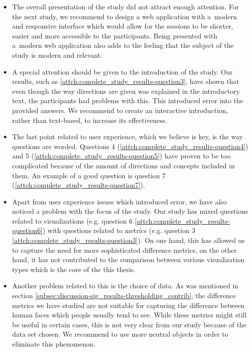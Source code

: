 \begin{itemize}
	\item The overall presentation of the study did not attract enough attention. For the next study, we recommend to design a web application with a~modern and responsive interface which would allow for the sessions to be shorter, easier and more accessible to the participants. Being presented with a~modern web application also adds to the feeling that the subject of the study is modern and relevant.
	\item A special attention should be given to the introduction of the study. Our results, such as \ref{attch:complete_study_results-question3}, have shown that even though the way directions are given was explained in the introductory text, the participants had problems with this. This introduced error into the provided answers. We recommend to create an interactive introduction, rather than text-based, to increase its effectiveness.
	\item The last point related to user experience, which we believe is key, is the way questions are worded. Questions 4 (\ref{attch:complete_study_results-question4}) and 5 (\ref{attch:complete_study_results-question5}) have proven to be too complicated because of the amount of directions and concepts included in them. An example of a good question is question 7 (\ref{attch:complete_study_results-question7}).
	\item Apart from user experience issues which introduced error, we have also noticed a problem with the focus of the study. Our study has mixed questions related to visualizations (e.g. question 6 \ref{attch:complete_study_results-question6}) with questions related to metrics (e.g. question 3 \ref{attch:complete_study_results-question3}). On one hand, this has allowed us to capture the need for more sophisticated difference metrics, on the other hand, it has not contributed to the comparison between various visualization types which is the core of the this thesis.
	\item Another problem related to this is the choice of data. As was mentioned in section \ref{subsec:discussion-sig_results-thresholding_contrib}, the difference metrics we have studied are not suitable for capturing the difference between human faces which people usually tend to see. While these metrics might still be useful in certain cases, this is not very clear from our study because of the data set chosen. We recommend to use more neutral objects in order to eliminate this phenomenon.
\end{itemize}

